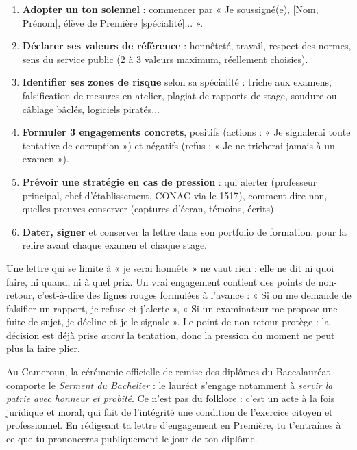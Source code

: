 \documentclass[11pt]{article}
\newcommand{\cle}[1]{{\popxbold\color{popdark}#1}}
\begin{document}
\begin{methode}
\begin{enumerate}
\item \textbf{Adopter un ton solennel} : commencer par « Je soussigné(e), [Nom, Prénom], élève de Première [spécialité]... ».
\item \textbf{Déclarer ses valeurs de référence} : honnêteté, travail, respect des normes, sens du service public (2 à 3 valeurs maximum, réellement choisies).
\item \textbf{Identifier ses zones de risque} selon sa spécialité : triche aux examens, falsification de mesures en atelier, plagiat de rapports de stage, soudure ou câblage bâclés, logiciels piratés...
\item \textbf{Formuler 3 engagements concrets}, positifs (actions : « Je signalerai toute tentative de corruption ») et négatifs (refus : « Je ne tricherai jamais à un examen »).
\item \textbf{Prévoir une stratégie en cas de pression} : qui alerter (professeur principal, chef d'établissement, CONAC via le 1517), comment dire non, quelles preuves conserver (captures d'écran, témoins, écrits).
\item \textbf{Dater, signer} et conserver la lettre dans son \cle{portfolio} de formation, pour la relire avant chaque examen et chaque stage.
\end{enumerate}
\end{methode}

\begin{attention}
Une lettre qui se limite à « je serai honnête » ne vaut rien : elle ne dit ni quoi faire, ni quand, ni à quel prix. Un vrai engagement contient des \cle{points de non-retour}, c'est-à-dire des lignes rouges formulées à l'avance : « Si on me demande de falsifier un rapport, je refuse et j'alerte », « Si un examinateur me propose une fuite de sujet, je décline et je le signale ». Le point de non-retour protège : la décision est déjà prise \emph{avant} la tentation, donc la pression du moment ne peut plus la faire plier.
\end{attention}

\begin{savaistu}
Au Cameroun, la cérémonie officielle de remise des diplômes du Baccalauréat comporte le \emph{Serment du Bachelier} : le lauréat s'engage notamment à \emph{servir la patrie avec honneur et probité}. Ce n'est pas du folklore : c'est un acte à la fois juridique et moral, qui fait de l'intégrité une condition de l'exercice citoyen et professionnel. En rédigeant ta lettre d'engagement en Première, tu t'entraînes à ce que tu prononceras publiquement le jour de ton diplôme.
\end{savaistu}
\end{document}
